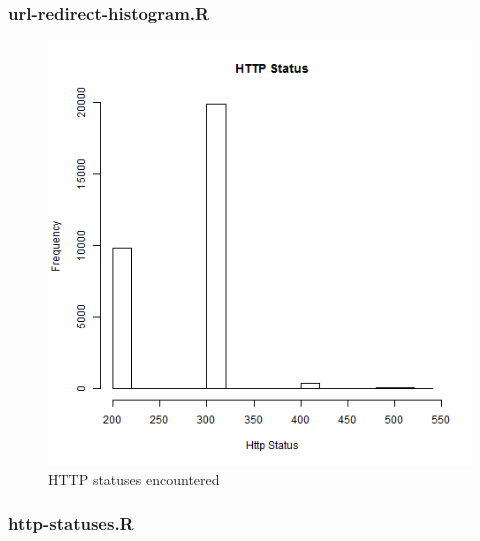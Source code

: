 \subsubsection{url-redirect-histogram.R}


\newpage
\begin{figure}[ht]    
    \begin{center}
        \includegraphics[scale=0.60]{http-statuses.png}
        \caption{HTTP statuses encountered}
        \label{HTTP statuses encountered}
    \end{center}
\end{figure}

\subsubsection{http-statuses.R}

